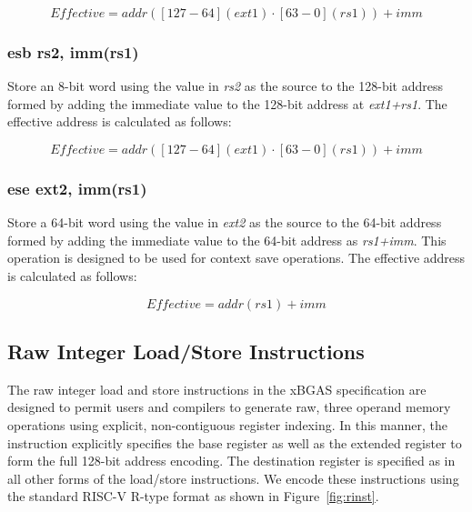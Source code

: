 \documentclass{article}
\begin{document}
\begin{equation}
Effective = addr([127-64](ext1) \cdot [63-0](rs1))+imm
\end{equation}

\subsubsection{esb rs2, imm(rs1)}
Store an 8-bit word using the value in \textit{rs2} as the source 
to the 128-bit address formed by adding the immediate value to the 
128-bit address at \textit{ext1+rs1}.  The effective address is calculated 
as follows: 

\begin{equation}
Effective = addr([127-64](ext1) \cdot [63-0](rs1))+imm
\end{equation}

\subsubsection{ese ext2, imm(rs1)}
Store a 64-bit word using the value in \textit{ext2} as the source to the 
64-bit address formed by adding the immediate value to the 64-bit 
address as \textit{rs1+imm}.  This operation is designed to be used for 
context save operations.  The effective address is calculated as follows: 

\begin{equation}
Effective = addr(rs1)+imm
\end{equation}

\subsection{Raw Integer Load/Store Instructions}
\label{sec:RawIntegerLoadStoreInstructions}

The raw integer load and store instructions in the xBGAS specification 
are designed to permit users and compilers to generate raw, three operand 
memory operations using explicit, non-contiguous register indexing.  In this manner, 
the instruction explicitly specifies the base register as well as the extended register 
to form the full 128-bit address encoding.  The destination register is specified as 
in all other forms of the load/store instructions.  We encode these instructions 
using the standard RISC-V R-type format as shown in Figure~\ref{fig:rinst}.  
\end{document}
